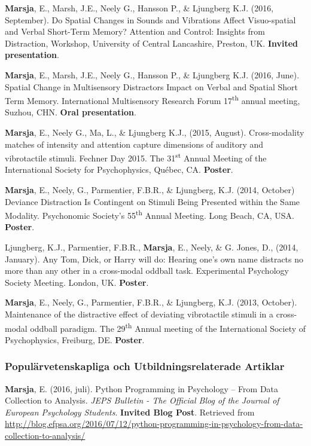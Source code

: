 \documentclass[]{article}
\begin{document}
\textbf{Marsja}, E., Marsh, J.E., Neely G., Hansson P., \& Ljungberg
K.J. (2016, September). Do Spatial Changes in Sounds and Vibrations
Affect Visuo-spatial and Verbal Short-Term Memory? Attention and
Control: Insights from Distraction, Workshop, University of Central
Lancashire, Preston, UK. \textbf{Invited presentation}.

\textbf{Marsja}, E., Marsh, J.E., Neely G., Hansson P., \& Ljungberg
K.J. (2016, June). Spatial Change in Multisensory Distractors Impact on
Verbal and Spatial Short Term Memory. International Multisensory
Research Forum 17\textsuperscript{th} annual meeting, Suzhou, CHN.
\textbf{Oral presentation}.

\textbf{Marsja}, E., Neely G., Ma, L., \& Ljungberg K.J., (2015,
August). Cross-modality matches of intensity and attention capture
dimensions of auditory and vibrotactile stimuli. Fechner Day 2015. The
31\textsuperscript{st} Annual Meeting of the International Society for
Psychophysics, Québec, CA. \textbf{Poster}.

\textbf{Marsja}, E., Neely, G., Parmentier, F.B.R., \& Ljungberg, K.J.
(2014, October) Deviance Distraction Is Contingent on Stimuli Being
Presented within the Same Modality. Psychonomic Society's
55\textsuperscript{th} Annual Meeting. Long Beach, CA, USA.
\textbf{Poster}.

Ljungberg, K.J., Parmentier, F.B.R., \textbf{Marsja}, E., Neely, \& G.
Jones, D., (2014, January). Any Tom, Dick, or Harry will do: Hearing
one's own name distracts no more than any other in a cross-modal oddball
task. Experimental Psychology Society Meeting. London, UK.
\textbf{Poster}.

\textbf{Marsja}, E., Neely, G., Parmentier, F.B.R., \& Ljungberg, K.J.
(2013, October). Maintenance of the distractive effect of deviating
vibrotactile stimuli in a cross-modal oddball paradigm. The
29\textsuperscript{th} Annual meeting of the International Society of
Psychophysics, Freiburg, DE. \textbf{Poster}.

\hypertarget{populuxe4rvetenskapliga-och-utbildningsrelaterade-artiklar}{%
\subsubsection{Populärvetenskapliga och Utbildningsrelaterade
Artiklar}\label{populuxe4rvetenskapliga-och-utbildningsrelaterade-artiklar}}

\textbf{Marsja}, E. (2016, juli). Python Programming in Psychology --
From Data Collection to Analysis. \emph{JEPS Bulletin - The Official
Blog of the Journal of European Psychology Students}. \textbf{Invited
Blog Post}. Retrieved from \sloppy
\url{http://blog.efpsa.org/2016/07/12/python-programming-in-psychology-from-data-collection-to-analysis/}
\end{document}
